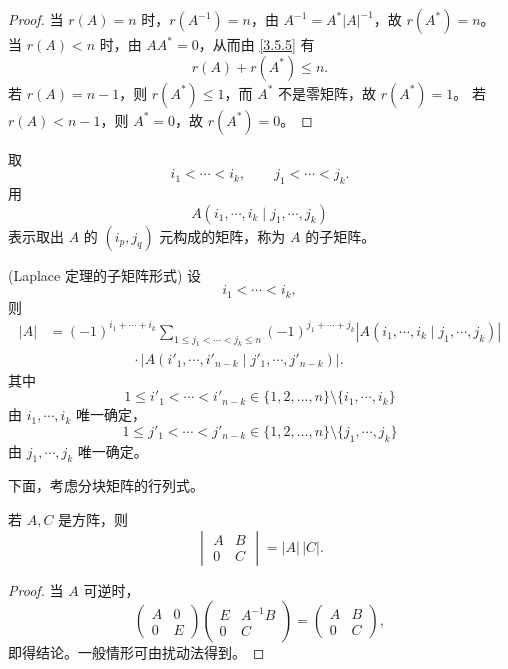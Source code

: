 \begin{proof}
	当 $r(A)=n$ 时，$r(A^{-1})=n$，由 $A^{-1}=A^*|A|^{-1}$，故 $r(A^*)=n$。
	当 $r(A)<n$ 时，由 $AA^*=0$，从而由 \ref{3.5.5} 有
	\[
	r(A)+r(A^*)\leq n.
	\]
	若 $r(A)=n-1$，则 $r(A^*)\leq1$，而 $A^*$ 不是零矩阵，故 $r(A^*)=1$。
	若 $r(A)<n-1$，则 $A^*=0$，故 $r(A^*)=0$。
\end{proof}

\begin{definition}\label{3.8.9}\label{p1:concept:c3-l2544}
	取
	\[
	i_1<\cdots<i_k,
	\qquad
	j_1<\cdots<j_k.
	\]
	用
	\[
	A(i_1,\cdots,i_k\mid j_1,\cdots,j_k)
	\]
	表示取出 $A$ 的 $(i_p,j_q)$ 元构成的矩阵，称为 $A$ 的子矩阵。
\end{definition}

\begin{theorem}(Laplace 定理的子矩阵形式)\label{3.8.10}
	设
	\[
	i_1<\cdots<i_k,
	\]
	则
	\[
	\begin{aligned}
		|A|
		&=(-1)^{i_1+\cdots+i_k}
		\sum_{1\leq j_1<\cdots<j_k\leq n}
		(-1)^{j_1+\cdots+j_k}
		\left|A(i_1,\cdots,i_k\mid j_1,\cdots,j_k)\right|\\
		&\qquad\qquad\qquad\cdot
		\left|A(i'_1,\cdots,i'_{n-k}\mid j'_1,\cdots,j'_{n-k})\right|.
	\end{aligned}
	\]
	其中
	\[
	1\leq i'_1<\cdots<i'_{n-k}\in\{1,2,\ldots,n\}\setminus\{i_1,\cdots,i_k\}
	\]
	由 $i_1,\cdots,i_k$ 唯一确定，
	\[
	1\leq j'_1<\cdots<j'_{n-k}\in\{1,2,\ldots,n\}\setminus\{j_1,\cdots,j_k\}
	\]
	由 $j_1,\cdots,j_k$ 唯一确定。
\end{theorem}

下面，考虑分块矩阵的行列式。

\begin{proposition}\label{3.8.11}
	若 $A,C$ 是方阵，则
	\[
	\begin{vmatrix}
		A&B\\
		0&C
	\end{vmatrix}
	=|A|\,|C|.
	\]
\end{proposition}

\begin{proof}
	当 $A$ 可逆时，
	\[
	\begin{pmatrix}
		A&0\\
		0&E
	\end{pmatrix}
	\begin{pmatrix}
		E&A^{-1}B\\
		0&C
	\end{pmatrix}
	=
	\begin{pmatrix}
		A&B\\
		0&C
	\end{pmatrix},
	\]
	即得结论。一般情形可由扰动法得到。
\end{proof}


